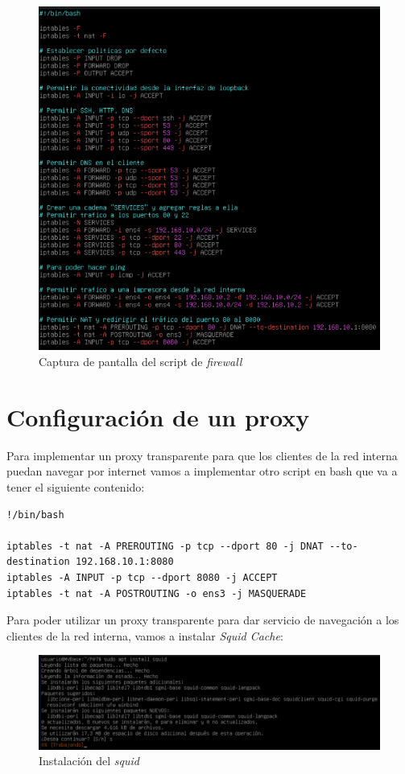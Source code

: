 \documentclass{report}
\begin{document}
\begin{figure}[H]
  \centering
  \includegraphics[scale=0.65]{img/firewall.png}
  \caption{Captura de pantalla del script de \emph{firewall}}
  \label{fig:script firewall}
\end{figure}

\chapter{Configuración de un proxy}
Para implementar un proxy transparente para que los clientes de la red interna
puedan navegar por internet vamos a implementar otro script en bash que va a
tener el siguiente contenido:

\begin{verbatim}
!/bin/bash

iptables -t nat -A PREROUTING -p tcp --dport 80 -j DNAT --to-destination 192.168.10.1:8080
iptables -A INPUT -p tcp --dport 8080 -j ACCEPT
iptables -t nat -A POSTROUTING -o ens3 -j MASQUERADE
  \end{verbatim}

Para poder utilizar un proxy transparente para dar servicio de navegación a los
clientes de la red interna, vamos a instalar \emph{Squid Cache}:

\begin{figure}[H]
  \centering
  \includegraphics[scale=0.5]{img/squid.png}
  \caption{Instalación del \emph{squid}}
  \label{fig:squid}
\end{figure}
\end{document}
